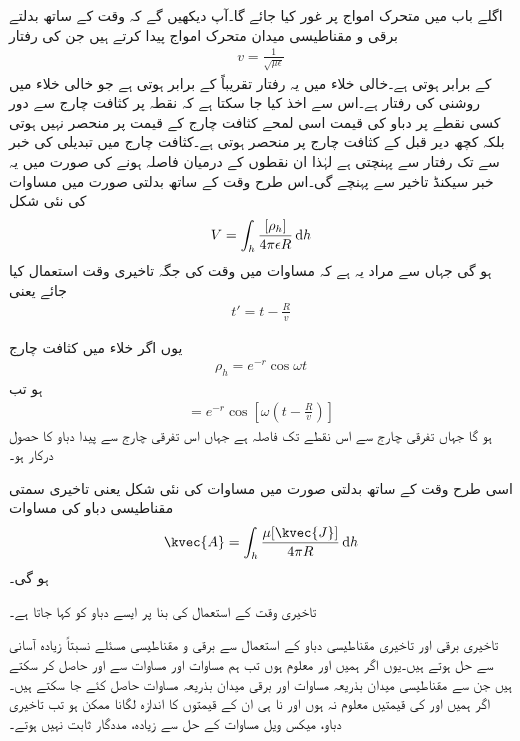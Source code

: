 اگلے باب میں متحرک امواج پر غور کیا جائے گا۔آپ دیکھیں گے کہ وقت کے ساتھ بدلتے برقی و مقناطیسی میدان متحرک امواج پیدا کرتے ہیں جن کی رفتار 
\begin{align}
v=\frac{1}{\sqrt{\mu \epsilon}}
\end{align} 
کے برابر ہوتی ہے۔خالی خلاء میں یہ رفتار تقریباً  کے برابر ہوتی ہے جو خالی خلاء میں روشنی کی رفتار ہے۔اس سے اخذ کیا جا سکتا ہے کہ نقطہ  پر کثافت چارج سے دور کسی نقطے  پر دباو کی قیمت اسی لمحے کثافت چارج کے قیمت پر منحصر نہیں ہوتی بلکہ کچھ دیر قبل کے کثافت چارج پر منحصر ہوتی ہے۔کثافت چارج میں تبدیلی کی خبر  سے  تک رفتار  سے پہنچتی ہے لہٰذا ان نقطوں کے درمیان فاصلہ  ہونے کی صورت میں یہ خبر  سیکنڈ تاخیر سے پہنچے گی۔اس طرح وقت کے ساتھ بدلتی صورت میں مساوات   کی نئی شکل
\begin{align}\label{مساوات_میکس_ویل_تاخیری_غیر_سمتی_دباو}
V=\int_h \frac{[\rho_h]}{4\pi \epsilon R} \dif h
\end{align}
ہو گی جہاں  سے مراد یہ ہے کہ مساوات میں وقت  کی جگہ تاخیری وقت  استعمال کیا جائے یعنی
\begin{align*}
t'=t-\frac{R}{v}
\end{align*}

یوں اگر خلاء میں کثافت چارج
\begin{align*}
\rho_h=e^{-r} \cos \omega t
\end{align*}
ہو تب
\begin{align*}
[\rho_h]=e^{-r} \cos \left[\omega \left(t-\frac{R}{v} \right) \right]
\end{align*}
ہو گا جہاں  تفرقی چارج سے اس نقطے تک فاصلہ ہے جہاں اس تفرقی چارج سے پیدا دباو کا حصول درکار ہو۔

اسی طرح وقت کے ساتھ بدلتی صورت میں مساوات  کی نئی شکل یعنی تاخیری سمتی مقناطیسی دباو کی مساوات
\begin{align}\label{مساوات_میکس_ویل_تاخیری_سمتی_دباو}
\kvec{A}=\int_h \frac{\mu [\kvec{J}]}{4\pi R} \dif h
\end{align}
ہو گی۔

تاخیری وقت کے استعمال کی بنا پر ایسے دباو کو  کہا جاتا ہے۔

تاخیری برقی اور تاخیری مقناطیسی دباو کے استعمال سے برقی و مقناطیسی مسئلے نسبتاً زیادہ آسانی سے حل ہوتے ہیں۔یوں اگر ہمیں  اور  معلوم ہوں تب ہم مساوات  اور مساوات  سے  اور  حاصل کر سکتے ہیں جن سے مقناطیسی میدان بذریعہ مساوات  اور برقی میدان بذریعہ مساوات  حاصل کئے جا سکتے ہیں۔اگر ہمیں  اور  کی قیمتیں معلوم نہ ہوں اور نا ہی ان کے قیمتوں کا اندازہ لگانا ممکن ہو تب تاخیری دباو، میکس ویل مساوات کے حل سے زیادہ، مددگار ثابت نہیں ہوتے۔ 

